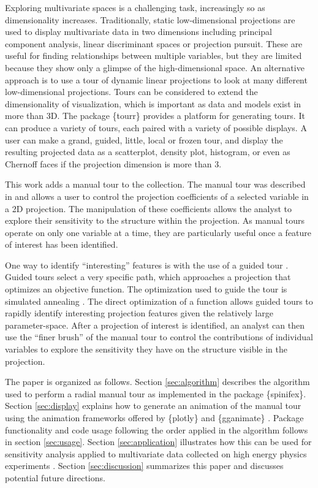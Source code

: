 \documentclass{monashthesis}
\begin{document}
Exploring multivariate spaces is a challenging task, increasingly so as dimensionality increases. Traditionally, static low-dimensional projections are used to display multivariate data in two dimensions including principal component analysis, linear discriminant spaces or projection pursuit. These are useful for finding relationships between multiple variables, but they are limited because they show only a glimpse of the high-dimensional space. An alternative approach is to use a tour \autocite{asimov_grand_1985} of dynamic linear projections to look at many different low-dimensional projections. Tours can be considered to extend the dimensionality of visualization, which is important as data and models exist in more than 3D. The package \{tourr\} \autocite{wickham_tourr:_2011} provides a platform for generating tours. It can produce a variety of tours, each paired with a variety of possible displays. A user can make a grand, guided, little, local or frozen tour, and display the resulting projected data as a scatterplot, density plot, histogram, or even as Chernoff faces if the projection dimension is more than 3.

This work adds a manual tour to the collection. The manual tour was described in \textcite{cook_manual_1997} and allows a user to control the projection coefficients of a selected variable in a 2D projection. The manipulation of these coefficients allows the analyst to explore their sensitivity to the structure within the projection. As manual tours operate on only one variable at a time, they are particularly useful once a feature of interest has been identified.

One way to identify ``interesting'' features is with the use of a guided tour \autocite{cook_grand_1995}. Guided tours select a very specific path, which approaches a projection that optimizes an objective function. The optimization used to guide the tour is simulated annealing \autocite{kirkpatrick_optimization_1983}. The direct optimization of a function allows guided tours to rapidly identify interesting projection features given the relatively large parameter-space. After a projection of interest is identified, an analyst can then use the ``finer brush'' of the manual tour to control the contributions of individual variables to explore the sensitivity they have on the structure visible in the projection.

The paper is organized as follows. Section \ref{sec:algorithm} describes the algorithm used to perform a radial manual tour as implemented in the package \{spinifex\}. Section \ref{sec:display} explains how to generate an animation of the manual tour using the animation frameworks offered by \{plotly\} \autocite{sievert_interactive_2020} and \{gganimate\} \autocite{pedersen_gganimate_2020}. Package functionality and code usage following the order applied in the algorithm follows in section \ref{sec:usage}. Section \ref{sec:application} illustrates how this can be used for sensitivity analysis applied to multivariate data collected on high energy physics experiments \autocite{wang_mapping_2018}. Section \ref{sec:discussion} summarizes this paper and discusses potential future directions.
\end{document}

